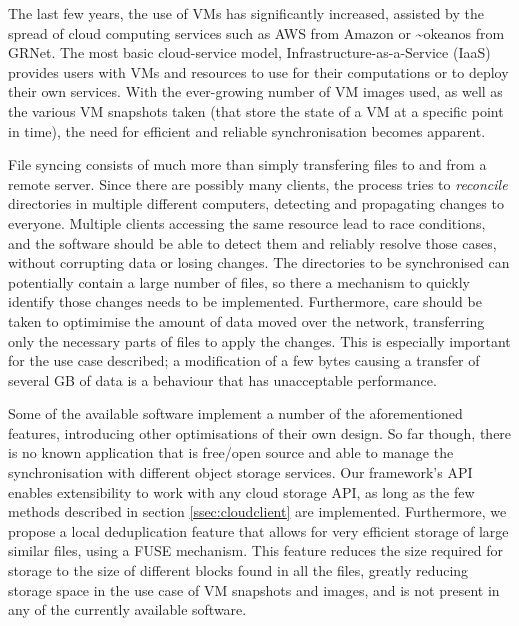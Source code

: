   The last few years, the use of VMs has significantly increased, assisted by the spread of cloud computing services such as AWS from Amazon or \textasciitilde okeanos from GRNet. The most basic cloud-service model, Infrastructure-as-a-Service (IaaS) provides users with VMs and resources to use for their computations or to deploy their own services. With the ever-growing number of VM images used, as well as the various VM snapshots taken (that store the state of a VM at a specific point in time), the need for efficient and reliable synchronisation becomes apparent.

  File syncing consists of much more than simply transfering files to and from a remote server. Since there are possibly many clients, the process tries to \emph{reconcile} directories in multiple different computers, detecting and propagating changes to everyone. Multiple clients accessing the same resource lead to race conditions, and the software should be able to detect them and reliably resolve those cases, without corrupting data or losing changes. The directories to be synchronised can potentially contain a large number of files, so there a mechanism to quickly identify those changes needs to be implemented. Furthermore, care should be taken to optimimise the amount of data moved over the network, transferring only the necessary parts of files to apply the changes. This is especially important for the use case described; a modification of a few bytes causing a transfer of several GB of data is a behaviour that has unacceptable performance.

  Some of the available software implement a number of the aforementioned features, introducing other optimisations of their own design. So far though, there is no known application that is free/open source and able to manage the synchronisation with different object storage services. Our framework's API enables extensibility to work with any cloud storage API, as long as the few methods described in section \ref{ssec:cloudclient} are implemented. Furthermore, we propose a local deduplication feature that allows for very efficient storage of large similar files, using a FUSE mechanism. This feature reduces the size required for storage to the size of different blocks found in all the files, greatly reducing storage space in the use case of VM snapshots and images, and is not present in any of the currently available software.


